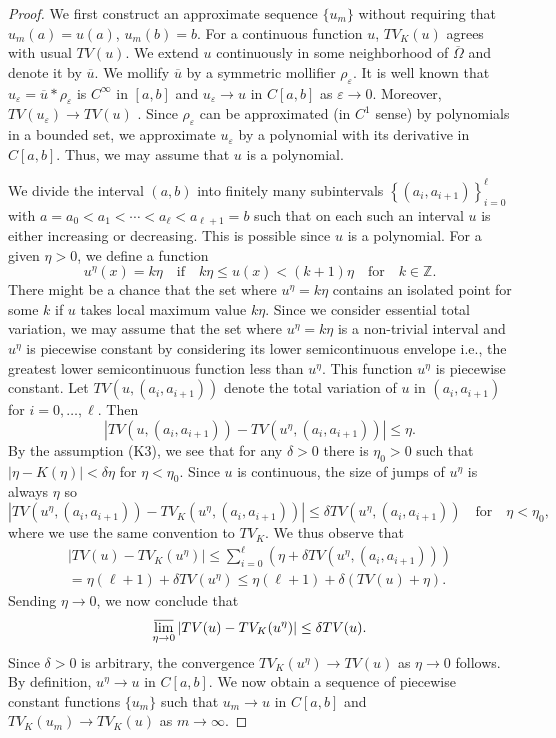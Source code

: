 \documentclass[12pt, reqno]{amsart}
\numberwithin{equation}{section}
\begin{document}
\begin{proof}
We first construct an approximate sequence $\{u_m\}$ without requiring that $u_m(a)=u(a)$, $u_m(b)=b$.
For a continuous function $u$, $TV_K(u)$ agrees with usual $TV(u)$.
 We extend $u$ continuously in some neighborhood of $\overline{\Omega}$ and denote it by $\overline{u}$.
 We mollify $\overline{u}$ by a symmetric mollifier $\rho_\varepsilon$.
 It is well known that $u_\varepsilon=\overline{u}*\rho_\varepsilon$ is $C^\infty$ in $[a,b]$ and $u_\varepsilon\to u$ in $C[a,b]$ as $\varepsilon\to0$.
 Moreover, $TV(u_\varepsilon)\to TV(u)$ \cite[Proposition 1.15]{Giu}.
 Since $\rho_\varepsilon$ can be approximated (in $C^1$ sense) by polynomials in a bounded set, we approximate $u_\varepsilon$ by a polynomial with its derivative in $C[a,b]$.
 Thus, we may assume that $u$ is a polynomial.

We divide the interval $(a,b)$ into finitely many subintervals $\left\{(a_i,a_{i+1})\right\}_{i=0}^\ell$ with $a=a_0<a_1< \cdots <a_\ell<a_{\ell+1}=b$ such that on each such an interval $u$ is either increasing or decreasing.
 This is possible since $u$ is a polynomial.
 For a given $\eta>0$, we define a function
\[
	u^\eta(x) = k\eta \quad\text{if}\quad
	k\eta \leq u(x) < (k+1)\eta
	\quad\text{for}\quad k \in \mathbb{Z}.
\]
There might be a chance that the set where $u^\eta=k\eta$ contains an isolated point for some $k$ if $u$ takes local maximum value $k\eta$.
 Since we consider essential total variation, we may assume that the set where $u^\eta=k\eta$ is a non-trivial interval and $u^\eta$ is piecewise constant by considering its lower semicontinuous envelope i.e., the greatest lower semicontinuous function less than $u^\eta$.
 This function $u^\eta$ is piecewise constant.
 Let $TV\left(u,(a_i,a_{i+1})\right)$ denote the total variation of $u$ in $(a_i,a_{i+1})$ for $i=0,\ldots,\ell$.
 Then
\[
	\left| TV\left(u,(a_i,a_{i+1})\right) - TV\left(u^\eta,(a_i,a_{i+1})\right) \right| \leq \eta.
\]
By the assumption (K3), we see that for any $\delta>0$ there is $\eta_0>0$ such that $\left|\eta-K(\eta)\right|<\delta\eta$ for $\eta<\eta_0$.
 Since $u$ is continuous, the size of jumps of $u^\eta$ is always $\eta$ so
\[
	\left\lvert TV \left(u^\eta,(a_i,a_{i+1})\right) - TV_K \left(u^\eta,(a_i,a_{i+1})\right) \right\rvert
	\leq \delta TV \left(u^\eta, (a_i,a_{i+1})\right)
	\quad\text{for}\quad \eta < \eta_0,
\]
where we use the same convention to $TV_K$.
 We thus observe that
\begin{gather*}
	\left\lvert TV (u) - TV_K (u^\eta) \right\rvert
	\leq \sum_{i=0}^\ell \left(\eta + \delta TV \left(u^\eta,(a_i,a_{i+1})\right) \right) \\
	= \eta (\ell+1) + \delta TV(u^\eta)
	\leq \eta (\ell+1) + \delta \left(TV(u)+\eta\right).
\end{gather*}
Sending $\eta\to0$, we now conclude that
\[
	\varlimsup_{\eta\to0} \left\lvert TV(u) - TV_K(u^\eta) \right\rvert
	\leq \delta TV(u).
\]
Since $\delta>0$ is arbitrary, the convergence $TV_K(u^\eta)\to TV(u)$ as $\eta\to0$ follows.
 By definition, $u^\eta\to u$ in $C[a,b]$.
 We now obtain a sequence of piecewise constant functions $\{u_m\}$ such that $u_m\to u$ in $C[a,b]$ and $TV_K(u_m)\to TV_K(u)$ as $m\to\infty$.


\end{proof}
\end{document}
